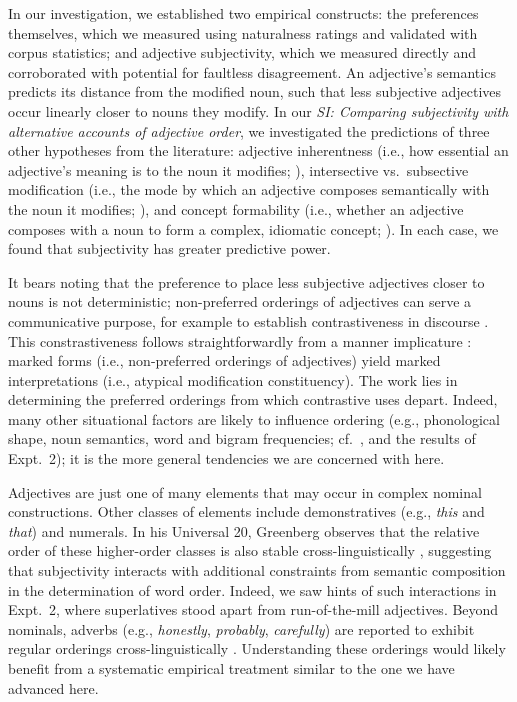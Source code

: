 \documentclass[manuscript]{stjour}
\begin{document}
In our investigation, we established two empirical constructs: the preferences themselves, which we measured using naturalness ratings and validated with corpus statistics; and adjective subjectivity, which we measured directly and corroborated with potential for faultless disagreement. 
An adjective's semantics predicts its distance from the modified noun, such that less subjective adjectives occur linearly closer to nouns they modify. In our \textit{SI: Comparing subjectivity with alternative accounts of adjective order}, we investigated the predictions of three other hypotheses from the literature: adjective inherentness (i.e., how essential an adjective's meaning is to the noun it modifies; \citealp{sweet1898,whorf1945}), intersective vs.~subsective modification (i.e., the mode by which an adjective composes semantically with the noun it modifies; \citealp{truswell2009}), and concept formability (i.e., whether an adjective composes with a noun to form a complex, idiomatic concept; \citealp{McNally2004,bouchard2005,svenonius2008}). In each case, we found that subjectivity has greater predictive power.

It bears noting that the preference to place less subjective adjectives closer to nouns is not deterministic; non-preferred orderings of adjectives can serve a communicative purpose, for example to establish contrastiveness in discourse \citep{martin1969,Martin1970,Hill1958,vendler1963}. This constrastiveness follows straightforwardly from a manner implicature \citep{levinson2000}: marked forms (i.e., non-preferred orderings of adjectives) yield marked interpretations (i.e., atypical modification constituency). The work lies in determining the preferred orderings from which  contrastive uses depart. Indeed, many other situational factors are likely to influence ordering (e.g., phonological shape, noun semantics, word and bigram frequencies; cf.~\citealp{wulff2003}, and the results of Expt.~2); it is the more general tendencies we are concerned with here.

Adjectives are just one of many elements that may occur in complex nominal constructions. Other classes of elements include demonstratives (e.g., \emph{this} and \emph{that}) and numerals. In his Universal 20, Greenberg observes that the relative order of these higher-order classes is also stable cross-linguistically \citep{greenberg1963,Culbertson2014}, suggesting that subjectivity interacts with additional constraints from semantic composition in the determination of word order. Indeed, we saw hints of such interactions in Expt.~2, where superlatives stood apart from run-of-the-mill adjectives. Beyond nominals, adverbs (e.g., \emph{honestly}, \emph{probably}, \emph{carefully}) are reported to exhibit regular orderings cross-linguistically \citep{cinque1999,ernst2002}. Understanding these orderings would likely benefit from a systematic empirical treatment similar to the one we have advanced here.
\end{document}
